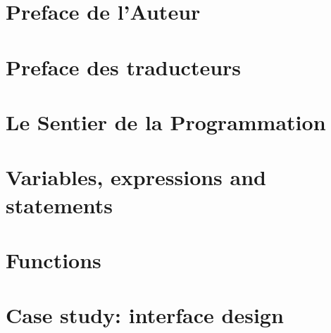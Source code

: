 \documentclass[french,10pt]{book}
\newcommand{\FR}{\color{blue} \normalsize}
\newcommand{\EN}{\color{red} \normalsize}
\newcommand{\UN}{\color{black}\normalsize}
\begin{document}

\EN

\FR
\chapter{Preface de l'Auteur}

\FR
\chapter{Preface des traducteurs}


\UN
\begin{latexonly}


\tableofcontents

\clearemptydoublepage

\end{latexonly}

\mainmatter

\FR
\chapter{Le Sentier de la Programmation}

\EN
\chapter{Variables, expressions and statements}

\EN
\chapter{Functions}

\EN
\chapter{Case study: interface design}
\label{turtlechap}

\EN
\end{document}
